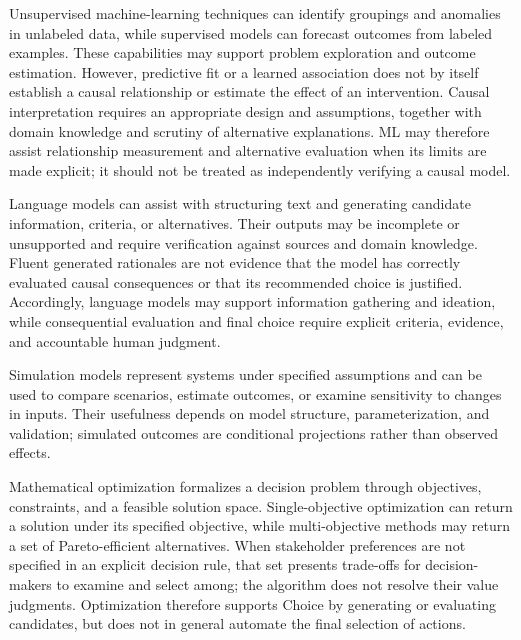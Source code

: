 \documentclass{sfuthesis}
\begin{document}
Unsupervised machine-learning techniques can identify groupings and anomalies in unlabeled data, while supervised models can forecast outcomes from labeled examples. These capabilities may support problem exploration and outcome estimation. However, predictive fit or a learned association does not by itself establish a causal relationship or estimate the effect of an intervention. Causal interpretation requires an appropriate design and assumptions, together with domain knowledge and scrutiny of alternative explanations. ML may therefore assist relationship measurement and alternative evaluation when its limits are made explicit; it should not be treated as independently verifying a causal model.\par
Language models can assist with structuring text and generating candidate information, criteria, or alternatives. Their outputs may be incomplete or unsupported and require verification against sources and domain knowledge. Fluent generated rationales are not evidence that the model has correctly evaluated causal consequences or that its recommended choice is justified. Accordingly, language models may support information gathering and ideation, while consequential evaluation and final choice require explicit criteria, evidence, and accountable human judgment.\par
Simulation models represent systems under specified assumptions and can be used to compare scenarios, estimate outcomes, or examine sensitivity to changes in inputs. Their usefulness depends on model structure, parameterization, and validation; simulated outcomes are conditional projections rather than observed effects.\par
Mathematical optimization formalizes a decision problem through objectives, constraints, and a feasible solution space. Single-objective optimization can return a solution under its specified objective, while multi-objective methods may return a set of Pareto-efficient alternatives. When stakeholder preferences are not specified in an explicit decision rule, that set presents trade-offs for decision-makers to examine and select among; the algorithm does not resolve their value judgments. Optimization therefore supports Choice by generating or evaluating candidates, but does not in general automate the final selection of actions.
\end{document}
